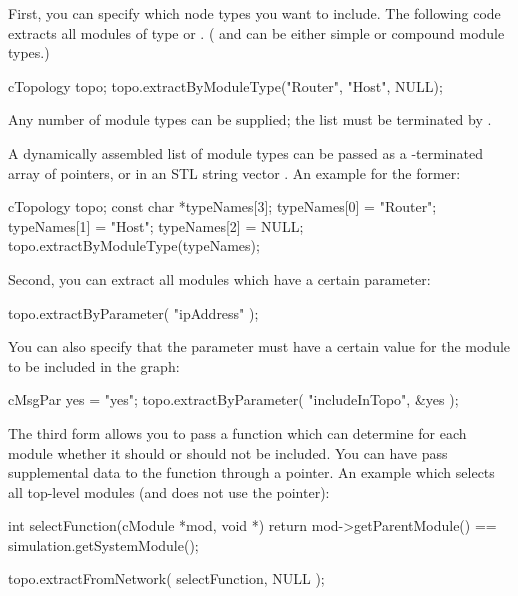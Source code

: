 First, you can specify which node types you want to include. The
following code extracts all modules of type  or .
( and  can be either simple or compound module types.)

\begin{cpp}
cTopology topo;
topo.extractByModuleType("Router", "Host", NULL);
\end{cpp}

Any number of module types can be supplied; the list must be terminated by .

A dynamically assembled list of module types can be passed as a
-terminated array of  pointers, or
in an STL string vector .
An example for the former:

\begin{cpp}
cTopology topo;
const char *typeNames[3];
typeNames[0] = "Router";
typeNames[1] = "Host";
typeNames[2] = NULL;
topo.extractByModuleType(typeNames);
\end{cpp}

Second, you can extract all modules which have a certain parameter:

\begin{cpp}
topo.extractByParameter( "ipAddress" );
\end{cpp}

You can also specify that the parameter must have a certain value
for the module to be included in the graph:

\begin{cpp}
cMsgPar yes = "yes";
topo.extractByParameter( "includeInTopo", &yes );
\end{cpp}

The third form allows you to pass a function which can determine for
each module whether it should or should not be included.  You can have
 pass supplemental data to the function through a
 pointer. An example which selects all top-level modules (and
does not use the  pointer):

\begin{cpp}
int selectFunction(cModule *mod, void *)
{
  return mod->getParentModule() == simulation.getSystemModule();
}

topo.extractFromNetwork( selectFunction, NULL );
\end{cpp}

%
%

